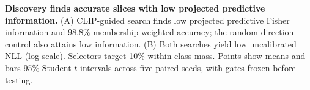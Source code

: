 \textbf{Discovery finds accurate slices with low projected predictive information.}
(A) CLIP-guided search finds low projected predictive Fisher information and 98.8\% membership-weighted accuracy; the random-direction control also attains low information. (B) Both searches yield low uncalibrated NLL (log scale). Selectors target 10\% within-class mass. Points show means and bars 95\% Student-$t$ intervals across five paired seeds, with gates frozen before testing.
